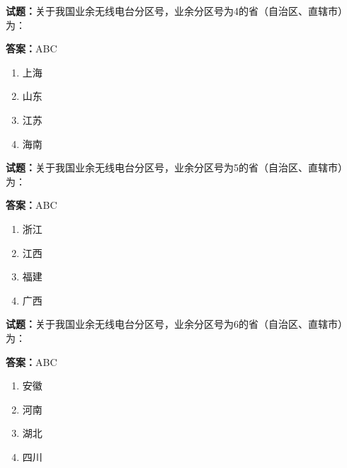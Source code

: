 \documentclass{ctexbook}
\begin{document}





\vspace{1em}

\textbf{试题：}关于我国业余无线电台分区号，业余分区号为4的省（自治区、直辖市）为： 

\textbf{答案：}ABC 

\begin{enumerate}[leftmargin=3em]
  \item 上海 

  \item 山东 

  \item 江苏 

  \item 海南 

\end{enumerate}





\vspace{1em}

\textbf{试题：}关于我国业余无线电台分区号，业余分区号为5的省（自治区、直辖市）为： 

\textbf{答案：}ABC 

\begin{enumerate}[leftmargin=3em]
  \item 浙江 

  \item 江西 

  \item 福建 

  \item 广西 

\end{enumerate}





\vspace{1em}

\textbf{试题：}关于我国业余无线电台分区号，业余分区号为6的省（自治区、直辖市）为： 

\textbf{答案：}ABC 

\begin{enumerate}[leftmargin=3em]
  \item 安徽 

  \item 河南 

  \item 湖北 

  \item 四川 

\end{enumerate}
\end{document}
